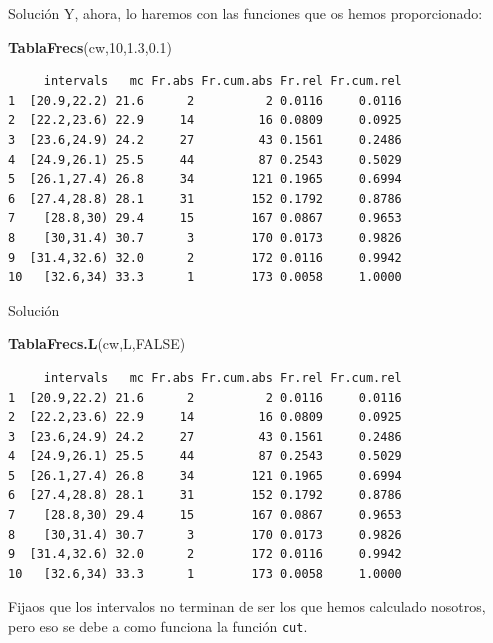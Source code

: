 \documentclass[
  ignorenonframetext,
]{beamer}
\newenvironment{Shaded}{\begin{snugshade}}{\end{snugshade}}
\newcommand{\ConstantTok}[1]{\textcolor[rgb]{0.56,0.35,0.01}{#1}}
\newcommand{\DecValTok}[1]{\textcolor[rgb]{0.00,0.00,0.81}{#1}}
\newcommand{\FloatTok}[1]{\textcolor[rgb]{0.00,0.00,0.81}{#1}}
\newcommand{\FunctionTok}[1]{\textcolor[rgb]{0.13,0.29,0.53}{\textbf{#1}}}
\newcommand{\NormalTok}[1]{#1}
\begin{document}
\begin{frame}[fragile]{Solución}
\label{soluciuxf3n-13}
Y, ahora, lo haremos con las funciones que os hemos proporcionado:

\begin{Shaded}
\begin{Highlighting}[]
\FunctionTok{TablaFrecs}\NormalTok{(cw,}\DecValTok{10}\NormalTok{,}\FloatTok{1.3}\NormalTok{,}\FloatTok{0.1}\NormalTok{)}
\end{Highlighting}
\end{Shaded}

\begin{verbatim}
     intervals   mc Fr.abs Fr.cum.abs Fr.rel Fr.cum.rel
1  [20.9,22.2) 21.6      2          2 0.0116     0.0116
2  [22.2,23.6) 22.9     14         16 0.0809     0.0925
3  [23.6,24.9) 24.2     27         43 0.1561     0.2486
4  [24.9,26.1) 25.5     44         87 0.2543     0.5029
5  [26.1,27.4) 26.8     34        121 0.1965     0.6994
6  [27.4,28.8) 28.1     31        152 0.1792     0.8786
7    [28.8,30) 29.4     15        167 0.0867     0.9653
8    [30,31.4) 30.7      3        170 0.0173     0.9826
9  [31.4,32.6) 32.0      2        172 0.0116     0.9942
10   [32.6,34) 33.3      1        173 0.0058     1.0000
\end{verbatim}
\end{frame}

\begin{frame}[fragile]{Solución}
\label{soluciuxf3n-14}
\begin{Shaded}
\begin{Highlighting}[]
\FunctionTok{TablaFrecs.L}\NormalTok{(cw,L,}\ConstantTok{FALSE}\NormalTok{)}
\end{Highlighting}
\end{Shaded}

\begin{verbatim}
     intervals   mc Fr.abs Fr.cum.abs Fr.rel Fr.cum.rel
1  [20.9,22.2) 21.6      2          2 0.0116     0.0116
2  [22.2,23.6) 22.9     14         16 0.0809     0.0925
3  [23.6,24.9) 24.2     27         43 0.1561     0.2486
4  [24.9,26.1) 25.5     44         87 0.2543     0.5029
5  [26.1,27.4) 26.8     34        121 0.1965     0.6994
6  [27.4,28.8) 28.1     31        152 0.1792     0.8786
7    [28.8,30) 29.4     15        167 0.0867     0.9653
8    [30,31.4) 30.7      3        170 0.0173     0.9826
9  [31.4,32.6) 32.0      2        172 0.0116     0.9942
10   [32.6,34) 33.3      1        173 0.0058     1.0000
\end{verbatim}

Fijaos que los intervalos no terminan de ser los que hemos calculado
nosotros, pero eso se debe a como funciona la función \texttt{cut}.
\end{frame}
\end{document}
